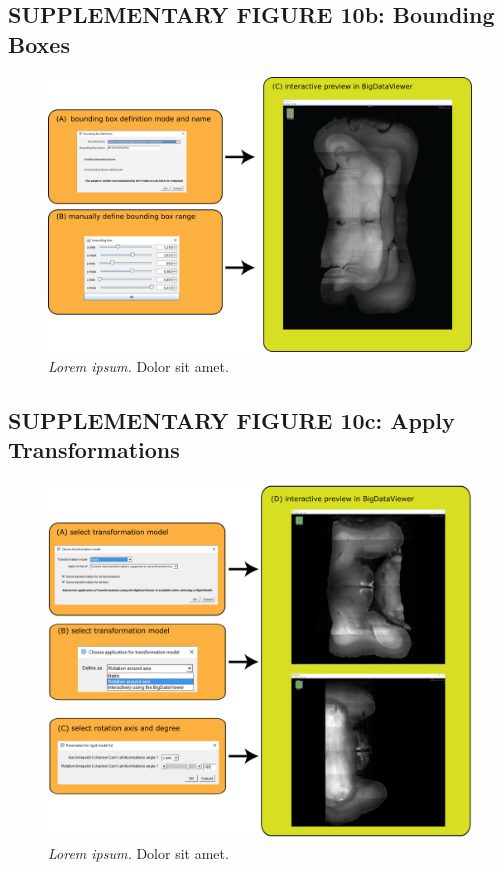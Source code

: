 \documentclass[]{spie}  %
\begin{document}
\subsection*{SUPPLEMENTARY FIGURE 10b: Bounding Boxes}
\vspace{1mm}
\begin{figure}[h!]
\includegraphics[width=\textwidth]{Supp-BB.png}
\vspace{-2.0mm}
\caption{\hspace{-0.5mm} \emph{Lorem ipsum.} Dolor sit amet.
}
\label{fig:sup-fig-link-explorer}
\end{figure}

\pagebreak

\subsection*{SUPPLEMENTARY FIGURE 10c: Apply Transformations}
\vspace{1mm}
\begin{figure}[h!]
\includegraphics[width=\textwidth]{Supp-Transformation.png}
\vspace{-2.0mm}
\caption{\hspace{-0.5mm} \emph{Lorem ipsum.} Dolor sit amet.
}
\label{fig:sup-fig-link-explorer}
\end{figure}
\end{document}
